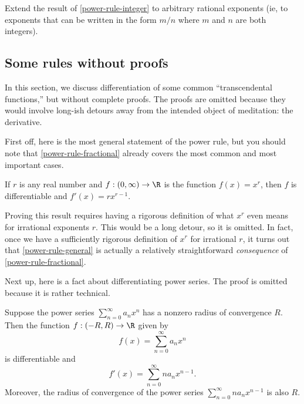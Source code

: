 \begin{exercise} \label{power-rule-fractional}
	Extend the result of \cref{power-rule-integer} to arbitrary rational exponents (ie, to exponents that can be written in the form $m/n$ where $m$ and $n$ are both integers). 
\end{exercise}

\subsection{Some rules without proofs}

In this section, we discuss differentiation of some common ``transcendental functions,'' but without complete proofs. The proofs are omitted because they would involve long-ish detours away from the intended object of meditation: the derivative.

First off, here is the most general statement of the power rule, but you should note that \cref{power-rule-fractional} already covers the most common and most important cases. 

\begin{proposition} \label{power-rule-general}
	If $r$ is any real number and $f : (0, \infty) \to \R$ is the function $f(x) = x^r$, then $f$ is differentiable and $f'(x) = rx^{r-1}$. 
\end{proposition}

Proving this result requires having a rigorous definition of what $x^r$ even means for irrational exponents $r$. This would be a long detour, so it is omitted. In fact, once we have a sufficiently rigorous definition of $x^r$ for irrational $r$, it turns out that \cref{power-rule-general} is actually a relatively straightforward \emph{consequence} of \cref{power-rule-fractional}. 

Next up, here is a fact about differentiating power series. The proof is omitted because it is rather technical. 

\begin{theorem} \label{differentiating-power-series}
	Suppose the power series $\sum_{n = 0}^\infty a_n x^n$
	has a nonzero radius of convergence $R$. Then the function $f : (-R, R) \to \R$ given by
	\[ f(x) = \sum_{n = 0}^\infty a_n x^n \]
	is differentiable and
	\[ f'(x) = \sum_{n = 0}^\infty na_n x^{n-1}. \]
	Moreover, the radius of convergence of the power series $\sum_{n = 0}^\infty na_n x^{n-1}$
	is also $R$. 
\end{theorem}

